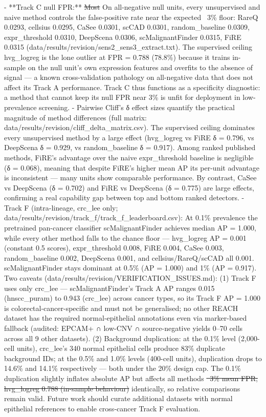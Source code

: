 \documentclass[11pt]{article}
\newcommand{\added}[1]{{\color{trackred}#1}}
\newcommand{\deleted}[1]{{\color{trackred}\sout{#1}}}
\begin{document}
- **Track C null FPR:** \deleted{Most} \added{On all-negative null units, every} unsupervised \added{and naive method controls the false-positive rate near the expected ~3\% floor: RareQ 0.0293, cellsius 0.0295, CaSee 0.0301, scCAD 0.0301, random\_baseline 0.0309, expr\_threshold 0.0310, DeepScena 0.0306, scMalignantFinder 0.0315, FiRE 0.0315 (data/results/revision/sens2\_sens3\_extract.txt). The supervised ceiling hvg\_logreg is the lone outlier at FPR = 0.788 (78.8\%) because it trains in-sample on the null unit's own expression features and overfits to the absence of signal — a known cross-validation pathology on all-negative data that does not affect its Track A performance. Track C thus functions as a specificity diagnostic: a method that cannot keep its null FPR near 3\% is unfit for deployment in low-prevalence screening. - Pairwise Cliff's δ effect sizes quantify the practical magnitude of method differences (full matrix: data/results/revision/cliff\_delta\_matrix.csv). The supervised ceiling dominates every unsupervised method by a large effect (hvg\_logreg vs FiRE δ = 0.796, vs DeepScena δ = 0.929, vs random\_baseline δ = 0.917). Among ranked published methods, FiRE's advantage over the naive expr\_threshold baseline is negligible (δ = 0.068), meaning that despite FiRE's higher mean AP its per-unit advantage is inconsistent — many units show comparable performance. By contrast, CaSee vs DeepScena (δ = 0.702) and FiRE vs DeepScena (δ = 0.775) are large effects, confirming a real capability gap between top and bottom ranked detectors. - Track F (intra-lineage, crc\_lee only; data/results/revision/track\_f/track\_f\_leaderboard.csv): At 0.1\% prevalence the pretrained pan-cancer classifier scMalignantFinder achieves median AP = 1.000, while every other method falls to the chance floor — hvg\_logreg AP = 0.001 (constant 0.5 scores), expr\_threshold 0.008, FiRE 0.004, CaSee 0.003, random\_baseline 0.002, DeepScena 0.001, and cellsius/RareQ/scCAD all 0.001. scMalignantFinder stays dominant at 0.5\% (AP = 1.000) and 1\% (AP = 0.917). Two caveats (data/results/revision/VERIFICATION\_ISSUES.md): (1) Track F uses only crc\_lee — scMalignantFinder's Track A AP ranges 0.015 (hnscc\_puram) to 0.943 (crc\_lee) across cancer types, so its Track F AP = 1.000 is colorectal-cancer-specific and must not be generalised; no other REACH dataset has the required normal-epithelial annotations even via marker-based fallback (audited: EPCAM+ ∩ low-CNV ∩ source-negative yields 0–70 cells across all 9 other datasets). (2) Background duplication: at the 0.1\% level (2,000-cell units), crc\_lee's 340 normal epithelial cells produce 83\% duplicate background IDs; at the 0.5\% and 1.0\% levels (400-cell units), duplication drops to 14.6\% and 14.1\% respectively — both under the 20\% design cap. The 0.1\% duplication slightly inflates absolute AP but affects all} methods \deleted{~3\% mean FPR; hvg\_logreg 0.788 (in-sample behaviour)} \added{identically, so relative comparisons remain valid. Future work should curate additional datasets with normal epithelial references to enable cross-cancer Track F evaluation.}
\end{document}
